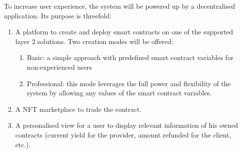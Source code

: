 To increase user experience, the {\projectName} system will be powered up by a decentralised application. Its purpose is threefold:
\begin{enumerate}
    \item A platform to create and deploy smart contracts on one of the supported layer 2 solutions. Two creation modes will be offered:
    \begin{enumerate}
        \item Basic: a simple approach with predefined smart contract variables for non-experienced users
        \item Professional: this mode leverages the full power and flexibility of the system by allowing any values of the smart contract variables.
    \end{enumerate}
    \item A NFT marketplace to trade the contract. 
    \item A personalised view for a user to display relevant information of his owned contracts (current yield for the provider, amount refunded for the client, etc.).
\end{enumerate}


